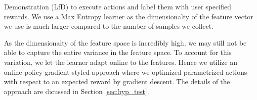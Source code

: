 Demonstration (LfD) to execute actions and label them with user specified rewards. We use a Max Entropy learner as the dimensionalty of the feature vector we use is much larger compared to the number of samples we collect.

As the dimensionalty of the feature space is incredibly high, we may still not be able to capture the entire variance in the feature space. To account for this variation, we let the learner adapt online to the features. Hence we utilize an online policy gradient styled approach where we optimized parametrized actions with respect to an expected reward by gradient descent. The details of the approach are dicussed in Section \ref{sec:hyp_test}.




% 
% 
